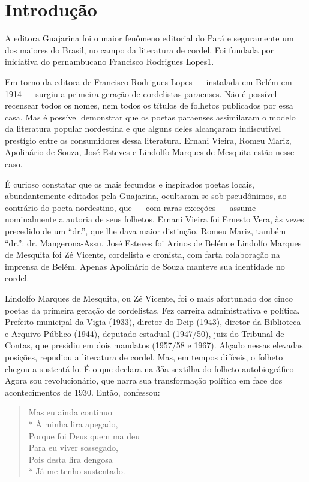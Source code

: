 
\chapter[Introdução, por Vicente Salles]{Introdução}

A editora Guajarina foi o maior fenômeno editorial do Pará e
seguramente um dos maiores do Brasil, no campo da literatura de
cordel. Foi fundada por iniciativa do pernambucano Francisco
Rodrigues Lopes1.

Em torno da editora de Francisco Rodrigues Lopes --- instalada em Belém
em 1914 --- surgiu a primeira geração de cordelistas paraenses. Não é
possível recensear todos os nomes, nem todos os títulos de folhetos
publicados por essa casa. Mas é possível demonstrar que os poetas
paraenses assimilaram o modelo da literatura popular nordestina e que
alguns deles alcançaram indiscutível prestígio entre os consumidores
dessa literatura. Ernani Vieira, Romeu Mariz, Apolinário de Souza,
José Esteves e Lindolfo Marques de Mesquita estão nesse caso.

 É curioso constatar que os mais fecundos e inspirados poetas locais,
abundantemente editados pela Guajarina, ocultaram-se sob pseudônimos,
ao contrário do poeta nordestino, que --- com raras exceções --- assume
nominalmente a autoria de seus folhetos. Ernani Vieira foi Ernesto
Vera, às vezes precedido de um “dr.”, que lhe dava maior distinção.
Romeu Mariz, também “dr.”: dr. Mangerona-Assu. José Esteves foi
Arinos de Belém e Lindolfo Marques de Mesquita foi Zé Vicente,
cordelista e cronista, com farta colaboração na imprensa de Belém.
Apenas Apolinário de Souza manteve sua identidade no cordel.

Lindolfo Marques de Mesquita, ou Zé Vicente, foi o mais afortunado dos
cinco poetas da primeira geração de cordelistas. Fez carreira
administrativa e política. Prefeito municipal da Vigia (1933),
diretor do Deip (1943), diretor da Biblioteca e Arquivo Público
(1944), deputado estadual (1947/50), juiz do Tribunal de Contas, que
presidiu em dois mandatos (1957/58 e 1967). Alçado nessas elevadas
posições, repudiou a literatura de cordel. Mas, em tempos difíceis, o
folheto chegou a sustentá-lo. É o que declara na 35a sextilha do
folheto autobiográfico Agora sou revolucionário, que narra sua
transformação política em face dos acontecimentos de 1930. Então,
confessou:

\begin{verse}
Mas eu ainda continuo\\*
À minha lira apegado,\\
Porque foi Deus quem ma deu\\
Para eu viver sossegado,\\
Pois desta lira dengosa\\*
Já me tenho sustentado.
\end{verse}

